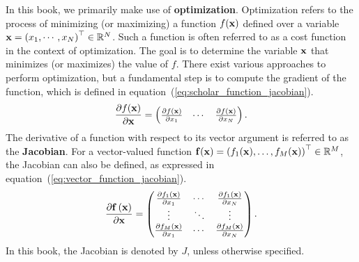 In this book, we primarily make use of {\bf optimization}.
Optimization refers to the process of minimizing (or maximizing) a function $f({\bf x})$ defined over a variable ${\bf x} = \left( x_{1}, \cdots, x_{N} \right)^{\top} \in \mathbb{R}^{N}$.
Such a function is often referred to as a cost function in the context of optimization.
The goal is to determine the variable ${\bf x}$ that minimizes (or maximizes) the value of $f$.
There exist various approaches to perform optimization, but a fundamental step is to compute the gradient of the function, which is defined in equation~(\ref{eq:scholar_function_jacobian}).
%
\begin{align}
  \frac{ \partial f({\bf x}) }{ \partial {\bf x} } =
  \left( \begin{matrix}
    \frac{ \partial f({\bf x}) }{ \partial x_{1} } &
    \cdots                                         &
    \frac{ \partial f({\bf x}) }{ \partial x_{N} }
  \end{matrix} \right).
  \label{eq:scholar_function_jacobian}
\end{align}
%
The derivative of a function with respect to its vector argument is referred to as the {\bf Jacobian}.
For a vector-valued function ${\bf f}({\bf x}) = \left( f_{1}({\bf x}), \ldots, f_{M}({\bf x}) \right)^{\top} \in \mathbb{R}^{M}$, the Jacobian can also be defined, as expressed in equation~(\ref{eq:vector_function_jacobian}).
%
\begin{align}
  \frac{ \partial {\bf f} \left( {\bf x} \right) }{ \partial {\bf x} } =
  \left( \begin{matrix}
    \frac{ \partial f_{1} \left( {\bf x} \right) }{ \partial x_{1} } &
    \cdots                                             &
    \frac{ \partial f_{1} \left( {\bf x} \right) }{ \partial x_{N} } \\
    \vdots                                             &
    \ddots                                             &
    \vdots                                             \\
    \frac{ \partial f_{M} \left( {\bf x} \right) }{ \partial x_{1} } &
    \cdots                                             &
    \frac{ \partial f_{M} \left( {\bf x} \right) }{ \partial x_{N} } \\
  \end{matrix} \right).
  \label{eq:vector_function_jacobian}
\end{align}
%
In this book, the Jacobian is denoted by $J$, unless otherwise specified.

